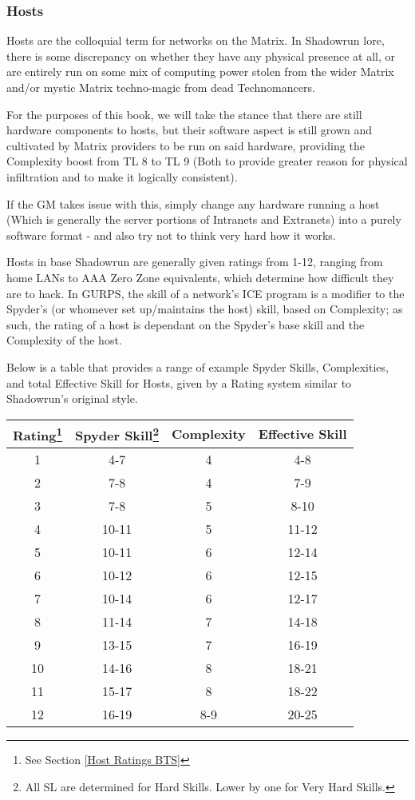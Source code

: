 \begin{multicols*}{3}
	\subsubsection{Hosts}
	
	Hosts are the colloquial term for networks on the Matrix. In Shadowrun lore, there is some discrepancy on whether they have any physical presence at all, or are entirely run on some mix of computing power stolen from the wider Matrix and/or mystic Matrix techno-magic from dead Technomancers. 
	
	For the purposes of this book, we will take the stance that there are still hardware components to hosts, but their software aspect is still grown and cultivated by Matrix providers to be run on said hardware, providing the Complexity boost from TL 8 to TL 9 (Both to provide greater reason for physical infiltration and to make it logically consistent). 
	
	If the GM takes issue with this, simply change any hardware running a host (Which is generally the server portions of Intranets and Extranets) into a purely software format - and also try not to think very hard how it works.
	
	Hosts in base Shadowrun are generally given ratings from 1-12, ranging from home LANs to AAA Zero Zone equivalents, which determine how difficult they are to hack. In GURPS, the skill of a network's ICE program is a modifier to the Spyder's (or whomever set up/maintains the host) skill, based on Complexity; as such, the rating of a host is dependant on the Spyder's base skill and the Complexity of the host.
	
	Below is a table that provides a range of example Spyder Skills, Complexities, and total Effective Skill for Hosts, given by a Rating system similar to Shadowrun's original style.
	
	\begin{center}
		\begin{tabularx}{0.47\textwidth}{|c|c|c|c|}
			\hline
			Rating\footnote{See Section \ref{Host Ratings BTS}} & Spyder Skill\footnote{All SL are determined for Hard Skills. Lower by one for Very Hard Skills. } & Complexity & Effective Skill \\
			\hline
			\hline
			1 & 4-7 & 4 & 4-8 \\
			2 & 7-8 & 4 & 7-9 \\
			3 & 7-8 & 5 & 8-10 \\
			4 & 10-11 & 5 & 11-12 \\
			5 & 10-11 & 6 & 12-14 \\
			6 & 10-12 & 6 & 12-15 \\
			7 & 10-14 & 6 & 12-17 \\
			8 & 11-14 & 7 & 14-18 \\
			9 & 13-15 & 7 & 16-19 \\
			10 & 14-16 & 8 & 18-21 \\
			11 & 15-17 & 8 & 18-22 \\
			12 & 16-19 & 8-9 & 20-25\\
			\hline
		\end{tabularx}
	\end{center}
	

\end{multicols*}
